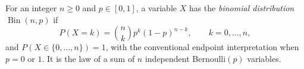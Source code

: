 
For an integer $n\ge0$ and $p\in[0,1]$, a variable $X$ has the \emph{binomial distribution} $\operatorname{Bin}(n,p)$ if
\[
P(X=k)=\binom nk p^k(1-p)^{n-k},\qquad k=0,\ldots,n,
\]
and $P(X\in\{0,\ldots,n\})=1$, with the conventional endpoint interpretation when $p=0$ or $1$. It is the law of a sum of $n$ independent Bernoulli$(p)$ variables.

